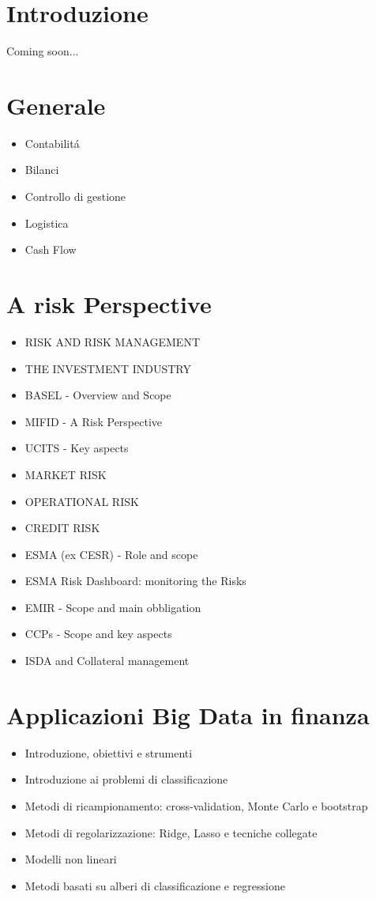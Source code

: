 \section{Introduzione}
Coming soon...

\section{Generale}
\begin{itemize}
 \item Contabilit\'{a}
 \item Bilanci
 \item Controllo di gestione
 \item Logistica
 \item Cash Flow
\end{itemize}

\section{A risk Perspective}
\begin{itemize}
	\item RISK AND RISK MANAGEMENT
	\item THE INVESTMENT INDUSTRY
	\item BASEL - Overview and Scope
	\item MIFID - A Risk Perspective
	\item UCITS - Key aspects
	\item MARKET RISK
	\item OPERATIONAL RISK
	\item CREDIT RISK
	\item ESMA (ex CESR) - Role and scope
	\item ESMA Risk Dashboard: monitoring the Risks
	\item EMIR - Scope and main obbligation
	\item CCPs - Scope and key aspects
	\item ISDA and Collateral management
\end{itemize}

\section{Applicazioni Big Data in finanza}
\begin{itemize}
	\item Introduzione, obiettivi e strumenti
	\item Introduzione ai problemi di classificazione
	\item Metodi di ricampionamento: cross-validation, Monte Carlo e bootstrap
	\item Metodi di regolarizzazione: Ridge, Lasso e tecniche collegate
	\item Modelli non lineari
	\item Metodi basati su alberi di classificazione e regressione
\end{itemize}

